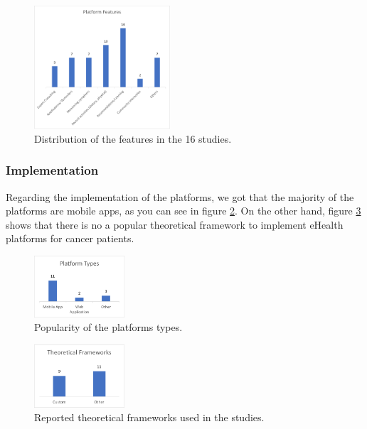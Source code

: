 \documentclass[conference]{IEEEtran}
\begin{document}
\begin{figure}[h]
    \centering
    \includegraphics[width=0.45\textwidth]{charts/Features.png}
    \caption{Distribution of the features in the 16 studies.}
    \label{fig:features_chart}
\end{figure}

\subsubsection{Implementation}

Regarding the implementation of the platforms, we got that the majority of the platforms are mobile apps, as you can see in figure \ref{fig:platform_types}. On the other hand, figure \ref{fig:theoretical_frameworks} shows that there is no a popular theoretical framework to implement eHealth platforms for cancer patients.

\begin{figure}[h]
    \centering
    \includegraphics[width=0.30\textwidth]{charts/platform_types.png}
    \caption{Popularity of the platforms types.}
    \label{fig:platform_types}
\end{figure}


\begin{figure}[h]
    \centering
    \includegraphics[width=0.30\textwidth]{charts/theoretical_frameworks.png}
    \caption{Reported theoretical frameworks used in the studies.}
    \label{fig:theoretical_frameworks}
\end{figure}
\end{document}
